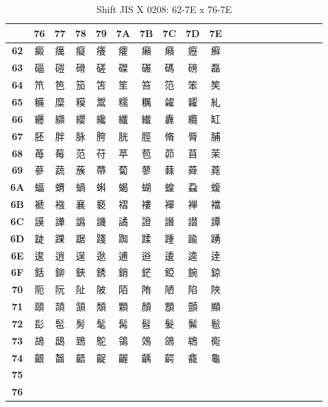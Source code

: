 \begin{table}[H]
\Fontified
\centering
\caption{Shift JIS X 0208: 62-7E x 76-7E}
\begin{tabular}{|Sc|Sc|Sc|Sc|Sc|Sc|Sc|Sc|Sc|Sc|}
\hline
 & \textbf{76} & \textbf{77} & \textbf{78} & \textbf{79} & \textbf{7A} & \textbf{7B} & \textbf{7C} & \textbf{7D} & \textbf{7E} \\ \hline
\textbf{62} & 癜 & 癘 & 癡 & 癢 & 癨 & 癩 & 癪 & 癧 & 癬 \\ \hline
\textbf{63} & 碯 & 磑 & 磆 & 磋 & 磔 & 碾 & 碼 & 磅 & 磊 \\ \hline
\textbf{64} & 笊 & 笆 & 笳 & 笘 & 笙 & 笞 & 笵 & 笨 & 笶 \\ \hline
\textbf{65} & 糒 & 糜 & 糢 & 鬻 & 糯 & 糲 & 糴 & 糶 & 糺 \\ \hline
\textbf{66} & 纒 & 纐 & 纓 & 纔 & 纖 & 纎 & 纛 & 纜 & 缸 \\ \hline
\textbf{67} & 胚 & 胖 & 脉 & 胯 & 胱 & 脛 & 脩 & 脣 & 脯 \\ \hline
\textbf{68} & 苺 & 莓 & 范 & 苻 & 苹 & 苞 & 茆 & 苜 & 茉 \\ \hline
\textbf{69} & 蔘 & 蔬 & 蔟 & 蔕 & 蔔 & 蓼 & 蕀 & 蕣 & 蕘 \\ \hline
\textbf{6A} & 蝠 & 蝟 & 蝸 & 蝌 & 蝎 & 蝴 & 蝗 & 蝨 & 蝮 \\ \hline
\textbf{6B} & 褫 & 襁 & 襄 & 褻 & 褶 & 褸 & 襌 & 褝 & 襠 \\ \hline
\textbf{6C} & 謨 & 譁 & 譌 & 譏 & 譎 & 證 & 譖 & 譛 & 譚 \\ \hline
\textbf{6D} & 跿 & 踝 & 踞 & 踐 & 踟 & 蹂 & 踵 & 踰 & 踴 \\ \hline
\textbf{6E} & 逡 & 逍 & 逞 & 逖 & 逋 & 逧 & 逶 & 逵 & 逹 \\ \hline
\textbf{6F} & 銛 & 鉚 & 鋏 & 銹 & 銷 & 鋩 & 錏 & 鋺 & 鍄 \\ \hline
\textbf{70} & 阨 & 阮 & 阯 & 陂 & 陌 & 陏 & 陋 & 陷 & 陜 \\ \hline
\textbf{71} & 頤 & 頡 & 頷 & 頽 & 顆 & 顏 & 顋 & 顫 & 顯 \\ \hline
\textbf{72} & 髟 & 髢 & 髣 & 髦 & 髯 & 髫 & 髮 & 髴 & 髱 \\ \hline
\textbf{73} & 鴣 & 鴟 & 鵄 & 鴕 & 鴒 & 鵁 & 鴿 & 鴾 & 鵆 \\ \hline
\textbf{74} & 齦 & 齧 & 齬 & 齪 & 齷 & 齲 & 齶 & 龕 & 龜 \\ \hline
\textbf{75} &  &  &  &  &  &  &  &  &  \\ \hline
\textbf{76} &  &  &  &  &  &  &  &  &  \\ \hline

\end{tabular}
\end{table}
